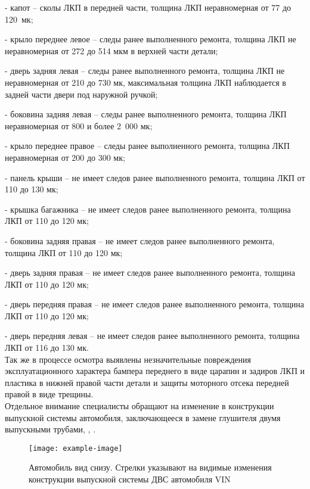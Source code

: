 - капот – сколы ЛКП в передней части, толщина ЛКП неравномерная от 77 до 120 мк;

- крыло переднее левое – следы ранее выполненного ремонта, толщина ЛКП не неравномерная от 272 до 514 мкм в верхней части детали;

- дверь задняя левая – следы ранее выполненного ремонта, толщина ЛКП не неравномерная от 210 до 730 мк, максимальная толщина ЛКП наблюдается в задней части двери под наружной ручкой;

- боковина задняя левая – следы ранее выполненного ремонта, толщина ЛКП  неравномерная от 800  и более 2 000 мк;

- крыло переднее правое – следы ранее выполненного ремонта, толщина ЛКП неравномерная от 200 до 300 мк;

- панель крыши – не имеет следов ранее выполненного ремонта, толщина ЛКП от 110 до 130 мк;

- крышка багажника – не имеет следов ранее выполненного ремонта, толщина ЛКП от 110 до 120 мк;

- боковина задняя правая – не имеет следов ранее выполненного ремонта, толщина ЛКП от 110 до 120 мк;

- дверь задняя правая – не имеет следов ранее выполненного ремонта, толщина ЛКП от 110 до 120 мк;

- дверь передняя правая – не имеет следов ранее выполненного ремонта, толщина ЛКП от 110 до 120 мк;

- дверь передняя левая – не имеет следов ранее выполненного ремонта, толщина ЛКП от 116 до 130 мк.\\

Так же в процессе осмотра выявлены незначительные повреждения эксплуатационного характера бампера переднего в виде царапин и задиров  ЛКП и пластика в нижней правой части детали и защиты моторного отсека передней правой в виде трещины.\\

Отдельное внимание специалисты обращают на изменение в конструкции выпускной системы автомобиля, заключающееся в замене  глушителя двумя выпускными трубами, , .\\


   \begin{figure}[H]
   	\centering
   	\texttt{[image: example-image]}
    \label{constr}
   	\caption{Автомобиль вид снизу. Стрелки указывают на видимые изменения конструкции выпускной системы ДВС автомобиля  VIN \vin}
     \end{figure}
   
